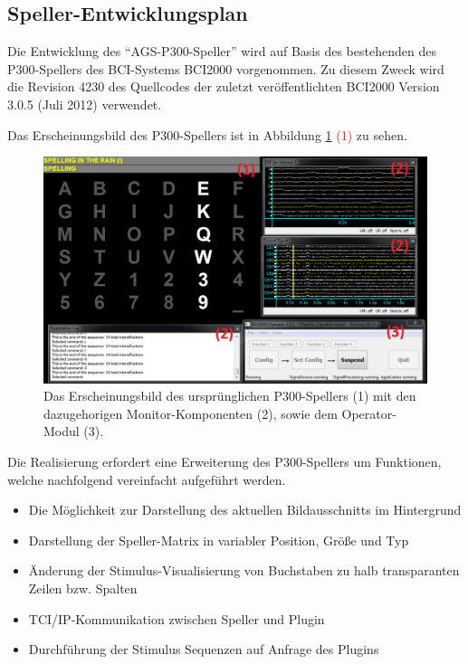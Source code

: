 \subsection{Speller-Entwicklungsplan}
\vspace{0.3cm}
Die Entwicklung des "`AGS-P300-Speller"' wird auf Basis des bestehenden des P300-Spellers des \acs{BCI}-Systems BCI2000 vorgenommen.
Zu diesem Zweck wird die Revision 4230 des Quellcodes der zuletzt veröffentlichten \acs{BCI2000} Version 3.0.5 (Juli 2012) \cite{Revision4230} verwendet.

Das Erscheinungsbild des P300-Spellers ist in Abbildung \ref{P300SpellerComponents} \textcolor{red}{(1)} zu sehen.\\

\begin{figure}[h!]
\begin{center}
\includegraphics[scale=0.48]{images/P300SpellerBase.png}
\caption{Das Erscheinungsbild des ursprünglichen P300-Spellers (1) mit den dazugehorigen Monitor-Komponenten (2), sowie dem Operator-Modul (3).}
\label{P300SpellerComponents}
\end{center}
\end{figure}







\pagebreak

Die Realisierung erfordert eine Erweiterung des P300-Spellers um Funktionen, welche nachfolgend vereinfacht aufgeführt werden.
\begin{itemize}
\item Die Möglichkeit zur Darstellung des aktuellen Bildausschnitts im Hintergrund
\item Darstellung der Speller-Matrix in variabler Position, Größe und Typ
\item Änderung der Stimulus-Visualisierung von Buchstaben zu halb transparanten Zeilen bzw. Spalten
\item TCI/IP-Kommunikation zwischen Speller und Plugin
\item Durchführung der Stimulus Sequenzen auf Anfrage des Plugins\\
\end{itemize}

